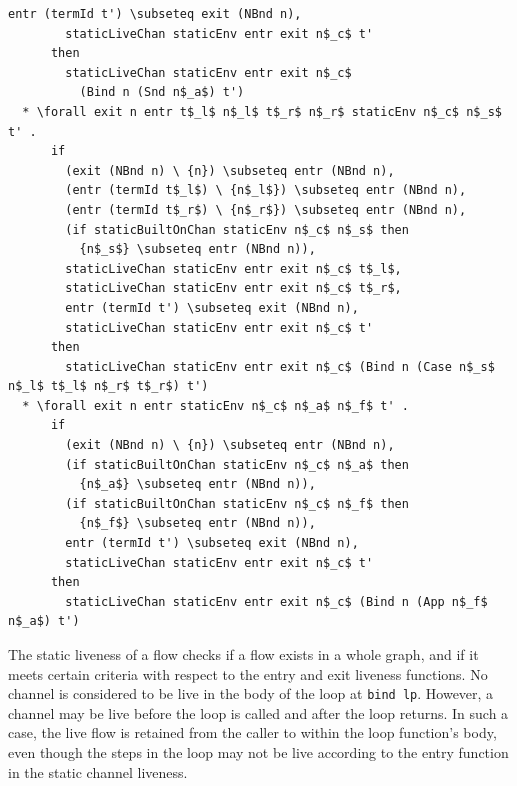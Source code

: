 \documentclass[letterpaper, 11pt]{extarticle}
\begin{document}
\begin{lstlisting}[language=logic, mathescape]
        entr (termId t') \subseteq exit (NBnd n),
        staticLiveChan staticEnv entr exit n$_c$ t'
      then
        staticLiveChan staticEnv entr exit n$_c$
          (Bind n (Snd n$_a$) t')
  * \forall exit n entr t$_l$ n$_l$ t$_r$ n$_r$ staticEnv n$_c$ n$_s$ t' .
      if 
        (exit (NBnd n) \ {n}) \subseteq entr (NBnd n),
        (entr (termId t$_l$) \ {n$_l$}) \subseteq entr (NBnd n),
        (entr (termId t$_r$) \ {n$_r$}) \subseteq entr (NBnd n),
        (if staticBuiltOnChan staticEnv n$_c$ n$_s$ then
          {n$_s$} \subseteq entr (NBnd n)),
        staticLiveChan staticEnv entr exit n$_c$ t$_l$,
        staticLiveChan staticEnv entr exit n$_c$ t$_r$,
        entr (termId t') \subseteq exit (NBnd n),
        staticLiveChan staticEnv entr exit n$_c$ t'
      then 
        staticLiveChan staticEnv entr exit n$_c$ (Bind n (Case n$_s$ n$_l$ t$_l$ n$_r$ t$_r$) t')
  * \forall exit n entr staticEnv n$_c$ n$_a$ n$_f$ t' .
      if
        (exit (NBnd n) \ {n}) \subseteq entr (NBnd n),
        (if staticBuiltOnChan staticEnv n$_c$ n$_a$ then
          {n$_a$} \subseteq entr (NBnd n)),
        (if staticBuiltOnChan staticEnv n$_c$ n$_f$ then
          {n$_f$} \subseteq entr (NBnd n)),
        entr (termId t') \subseteq exit (NBnd n),
        staticLiveChan staticEnv entr exit n$_c$ t'
      then
        staticLiveChan staticEnv entr exit n$_c$ (Bind n (App n$_f$ n$_a$) t')
\end{lstlisting}

The static liveness of a flow checks if a flow exists in a whole graph,
and if it meets certain criteria with respect to the entry and exit liveness
functions. 
No channel is considered to be live in the body of the loop at \lstinline[language=normal_lang]{bind lp}.
However, a channel may be live before the loop is
called and after the loop returns. In such a case, the live flow is retained
from the caller to within the loop function's body, even though the steps in
the loop may not be live according to the entry function in the static channel liveness.
\end{document}
